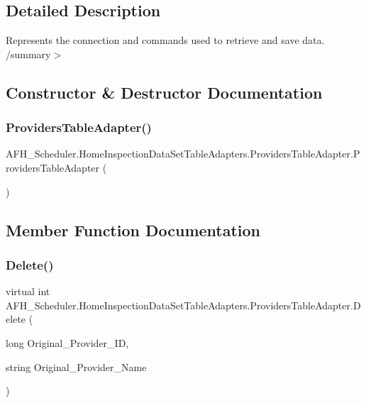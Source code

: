 \subsection{Detailed Description}
Represents the connection and commands used to retrieve and save data. /summary$>$ 

\subsection{Constructor \& Destructor Documentation}
\mbox{\label{class_a_f_h___scheduler_1_1_home_inspection_data_set_table_adapters_1_1_providers_table_adapter_a00a783b9c0d34af8bc97e49274d84b4c}} 
\subsubsection{ProvidersTableAdapter()}
{\footnotesize\ttfamily A\+F\+H\+\_\+\+Scheduler.\+Home\+Inspection\+Data\+Set\+Table\+Adapters.\+Providers\+Table\+Adapter.\+Providers\+Table\+Adapter (\begin{DoxyParamCaption}{ }\end{DoxyParamCaption})}



\subsection{Member Function Documentation}
\mbox{\label{class_a_f_h___scheduler_1_1_home_inspection_data_set_table_adapters_1_1_providers_table_adapter_a65fa9e63d6839c82005fec79e00a52f4}} 
\subsubsection{Delete()}
{\footnotesize\ttfamily virtual int A\+F\+H\+\_\+\+Scheduler.\+Home\+Inspection\+Data\+Set\+Table\+Adapters.\+Providers\+Table\+Adapter.\+Delete (\begin{DoxyParamCaption}\item[{long}]{Original\+\_\+\+Provider\+\_\+\+ID,  }\item[{string}]{Original\+\_\+\+Provider\+\_\+\+Name }\end{DoxyParamCaption})\hspace{0.3cm}{\ttfamily [virtual]}}

